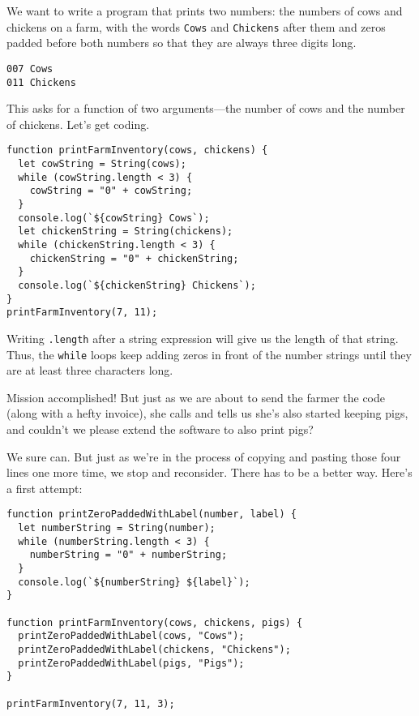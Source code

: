 We want to write a program that prints two numbers: the numbers of cows and chickens on a farm, with the words \lstinline`Cows` and \lstinline`Chickens` after them and zeros padded before both numbers so that they are always three digits long.

\begin{lstlisting}
007 Cows
011 Chickens
\end{lstlisting}
\noindent

This asks for a function of two arguments—the number of cows and the number of chickens. Let's get coding.

\begin{lstlisting}
function printFarmInventory(cows, chickens) {
  let cowString = String(cows);
  while (cowString.length < 3) {
    cowString = "0" + cowString;
  }
  console.log(`${cowString} Cows`);
  let chickenString = String(chickens);
  while (chickenString.length < 3) {
    chickenString = "0" + chickenString;
  }
  console.log(`${chickenString} Chickens`);
}
printFarmInventory(7, 11);
\end{lstlisting}
\noindent{}

Writing \lstinline`.length` after a string expression will give us the length of that string. Thus, the \lstinline`while` loops keep adding zeros in front of the number strings until they are at least three characters long.

Mission accomplished! But just as we are about to send the farmer the code (along with a hefty invoice), she calls and tells us she's also started keeping pigs, and couldn't we please extend the software to also print pigs?

We sure can. But just as we're in the process of copying and pasting those four lines one more time, we stop and reconsider. There has to be a better way. Here's a first attempt:

\begin{lstlisting}
function printZeroPaddedWithLabel(number, label) {
  let numberString = String(number);
  while (numberString.length < 3) {
    numberString = "0" + numberString;
  }
  console.log(`${numberString} ${label}`);
}

function printFarmInventory(cows, chickens, pigs) {
  printZeroPaddedWithLabel(cows, "Cows");
  printZeroPaddedWithLabel(chickens, "Chickens");
  printZeroPaddedWithLabel(pigs, "Pigs");
}

printFarmInventory(7, 11, 3);
\end{lstlisting}
\noindent{}

